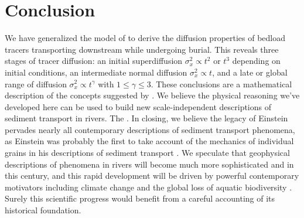 \documentclass[]{agujournal2018}
\begin{document}
\section{Conclusion}
We have generalized the model of \citet{Einstein1937} to derive the diffusion properties of bedload tracers transporting downstream while undergoing burial.
This reveals three stages of tracer diffusion: an initial superdiffusion $\sigma_x^2 \propto t^2$ or $t^3$ depending on initial conditions, an intermediate normal diffusion $\sigma_x^2 \propto t$, and a late or global range of diffusion $\sigma_x^2 \propto t^\gamma$ with $1\leq \gamma \leq 3$.
These conclusions are a mathematical description of the concepts suggested by \citet{Nikora2001a,Nikora2002}. 
We believe the physical reasoning we've developed here can be used to build new scale-independent descriptions of sediment transport in rivers.
The .
In closing, we believe the legacy of Einstein pervades nearly all contemporary descriptions of sediment transport phenomena, as Einstein was probably the first to take account of the mechanics of individual grains in his descriptions of sediment transport \citep{Einstein1937,Einstein1942,Einstein1950}.
We speculate that geophysical descriptions of phenomena in rivers will become much more sophisticated and  in this century, and this rapid development will be driven by powerful contemporary motivators including climate change \citep{Phillips2016} and the global loss of aquatic biodiversity \citep{Hauer2016}.
Surely this scientific progress would benefit from a careful accounting of its historical foundation.


\appendix
\end{document}
